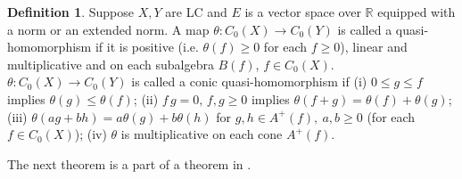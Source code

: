 \documentclass[sn-mathphys-num]{sn-jnl}%
\theoremstyle{thmstyleone}%
\theoremstyle{definition}
\newtheorem{definition}[theorem]{Definition}
\begin{document}
\begin{definition} \label{qhDef}
Suppose $X,Y$  are LC and $E$ is a vector space over $\mathbb{R}$ equipped with a norm or an extended norm. 
A map $\theta: C_0(X) \longrightarrow C_0(Y) $ is called a quasi-homomorphism if it is positive (i.e. $ \theta(f) \ge 0$ for each $ f \ge 0$),
linear and multiplicative  and  on each subalgebra $B(f)$, $f \in C_0(X)$.
$\theta: C_0(X) \longrightarrow C_0(Y) $ is called a conic quasi-homomorphism if 
(i) $0 \le g \le f$ implies $\theta(g) \le \theta(f)$;  (ii) $f\, g=0, \, f, g  \ge 0$ implies $ \theta(f+ g) = \theta(f) + \theta(g)$; 
(iii) $\theta(a g + bh) = a \theta(g) + b \theta(h)$ for $g,h \in A^+(f), \ a,b \ge 0$ (for each $f \in C_0(X)$);  
(iv) $\theta$ is multiplicative on each cone $A^+(f)$.
\end{definition} 

The next theorem is a part of a theorem in \cite[Sect. 5]{Butler:QLM}.
\end{document}

